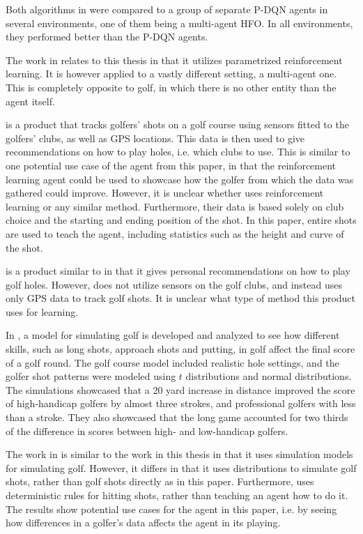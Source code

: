 \documentclass{kththesis}
\begin{document}
Both algorithms in \parencite{fu2019deep} were compared to a group of separate P-DQN agents in several environments, one of them being a multi-agent HFO. In all environments, they performed better than the P-DQN agents. 

The work in \parencite{fu2019deep} relates to this thesis in that it utilizes parametrized reinforcement learning. It is however applied to a vastly different setting, a multi-agent one. This is completely opposite to golf, in which there is no other entity than the agent itself.

\textcite{ArccosGo0:online} is a product that tracks golfers' shots on a golf course using sensors fitted to the golfers' clubs, as well as GPS locations. This data is then used to give recommendations on how to play holes, i.e. which clubs to use. This is similar to one potential use case of the agent from this paper, in that the reinforcement learning agent could be used to showcase how the golfer from which the data was gathered could improve. However, it is unclear whether \textcite{ArccosGo0:online} uses reinforcement learning or any similar method. Furthermore, their data is based solely on club choice and the starting and ending position of the shot. In this paper, entire shots are used to teach the agent, including statistics such as the height and curve of the shot.

\textcite{HelloBir63:online} is a product similar to \textcite{ArccosGo0:online} in that it gives personal recommendations on how to play golf holes. However, \textcite{HelloBir63:online} does not utilize sensors on the golf clubs, and instead uses only GPS data to track golf shots. It is unclear what type of method this product uses for learning.

In \parencite{ko2012simulation}, a model for simulating golf is developed and analyzed to see how different skills, such as long shots, approach shots and putting, in golf affect the final score of a golf round. The golf course model included realistic hole settings, and the golfer shot patterns were modeled using $t$ distributions and normal distributions. The simulations showcased that a 20 yard increase in distance improved the score of high-handicap golfers by almost three strokes, and professional golfers with less than a stroke. They also showcased that the long game accounted for two thirds of the difference in scores between high- and low-handicap golfers.

The work in \parencite{ko2012simulation} is similar to the work in this thesis in that it uses simulation models for simulating golf. However, it differs in that it uses distributions to simulate golf shots, rather than golf shots directly as in this paper. Furthermore, \parencite{ko2012simulation} uses deterministic rules for hitting shots, rather than teaching an agent how to do it. The results show potential use cases for the agent in this paper, i.e. by seeing how differences in a golfer's data affects the agent in its playing.
\end{document}
